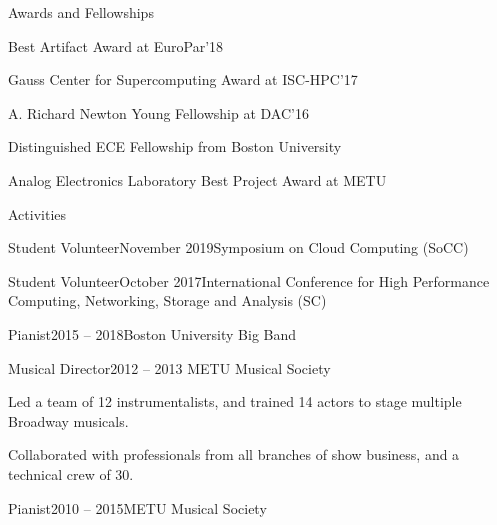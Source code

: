 \documentclass{resume}
\begin{document}
\begin{rSection}{Awards and Fellowships} \itemsep -3pt
  \item Best Artifact Award at EuroPar'18
  \item Gauss Center for Supercomputing Award at ISC-HPC'17
  \item A. Richard Newton Young Fellowship at DAC'16
  \item Distinguished ECE Fellowship from Boston University
  \item Analog Electronics Laboratory Best Project Award at METU
\end{rSection}

\begin{rSection}{Activities}
  \begin{rWorksectionNoList}{Student Volunteer}{November 2019}{Symposium on Cloud
      Computing (SoCC)}
  \end{rWorksectionNoList}

  \begin{rWorksectionNoList}{Student Volunteer}{October 2017}{International
      Conference for High Performance Computing, Networking, Storage and
      Analysis (SC)}
  \end{rWorksectionNoList}

  \begin{rWorksectionNoList}{Pianist}{2015 -- 2018}{Boston University Big Band}
  \end{rWorksectionNoList}

  \begin{rWorksection}{Musical Director}{2012 -- 2013}{
      METU Musical Society}
  \item Led a team of 12 instrumentalists, and trained 14 actors to stage
    multiple Broadway musicals.
  \item Collaborated with professionals from all branches of show business, and
    a technical crew of 30.
  \end{rWorksection}

  \begin{rWorksectionNoList}{Pianist}{2010 -- 2015}{METU Musical Society}
  \end{rWorksectionNoList}
\end{rSection}
\end{document}
